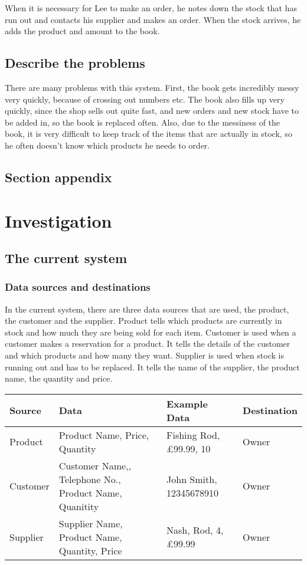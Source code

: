 When it is necessary for Lee to make an order, he notes down the stock that has run out and contacts his supplier and makes an order. When the stock arrives, he adds the product and amount to the book.

\subsection{Describe the problems}
There are many problems with this system. First, the book gets incredibly messy very quickly, because of crossing out numbers etc. The book also fills up very quickly, since the shop sells out quite fast, and new orders and new stock have to be added in, so the book is replaced often. Also, due to the messiness of the book, it is very difficult to keep track of the items that are actually in stock, so he often doesn't know which products he needs to order. 

\subsection{Section appendix}

\section{Investigation}

\subsection{The current system}

\subsubsection{Data sources and destinations}
In the current system, there are three data sources that are used, the product, the customer and the supplier. Product tells which products are currently in stock and how much they are being sold for each item. Customer is used when a customer makes a reservation for a product. It tells the details of the customer and which products and how many they want. Supplier is used when stock is running out and has to be replaced. It tells the name of the supplier, the product name, the quantity and price.

\begin{center}
\begin{tabular}{| l | p{5cm} | l | l |}
    \hline
    \textbf{Source} & \textbf{Data} & \textbf{Example Data} & \textbf{Destination} \\ \hline
    Product & Product Name, Price, Quantity & Fishing Rod, £99.99, 10 & Owner \\ \hline
    Customer & Customer Name,, Telephone No., Product Name, Quanitity & John Smith, 12345678910 & Owner \\ \hline
    Supplier & Supplier Name, Product Name, Quantity, Price & Nash, Rod, 4, £99.99 & Owner \\ \hline
  
\end{tabular}
\label{tab:range_examples}
\end{center}

